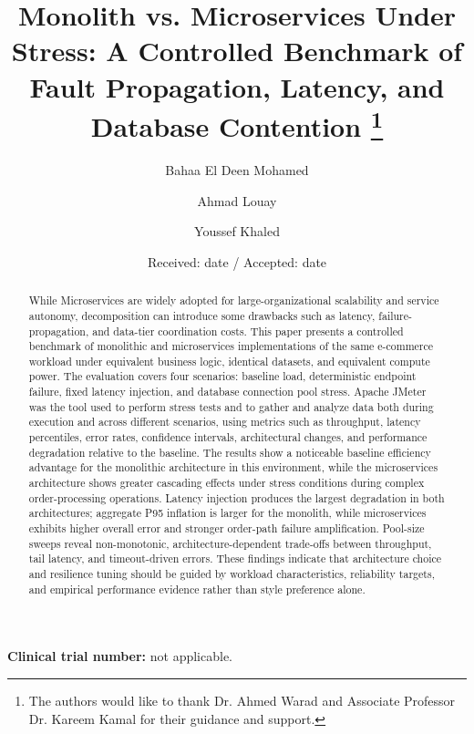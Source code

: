\documentclass[smallextended,natbib]{svjour3}
\begin{document}
\title{Monolith vs. Microservices Under Stress: A Controlled Benchmark of Fault Propagation, Latency, and Database Contention
	\thanks{The authors would like to thank Dr. Ahmed Warad and Associate Professor Dr. Kareem Kamal for their guidance and support.}
}


\author{Bahaa El Deen Mohamed \and Ahmad Louay \and Youssef Khaled}



\date{Received: date / Accepted: date}

\maketitle

\noindent\textbf{Clinical trial number:} not applicable.

\begin{abstract}
	While Microservices are widely adopted for large-organizational scalability and service autonomy, decomposition can introduce some drawbacks such as latency, failure-propagation, and data-tier coordination costs. This paper presents a controlled benchmark of monolithic and microservices implementations of the same e-commerce workload under equivalent business logic, identical datasets, and equivalent compute power. The evaluation covers four scenarios: baseline load, deterministic endpoint failure, fixed latency injection, and database connection pool stress. Apache JMeter was the tool used to perform stress tests and to gather and analyze data both during execution and across different scenarios, using metrics such as throughput, latency percentiles, error rates, confidence intervals, architectural changes, and performance degradation relative to the baseline.
	The results show a noticeable baseline efficiency advantage for the monolithic architecture in this environment, while the microservices architecture shows greater cascading effects under stress conditions during complex order-processing operations. Latency injection produces the largest degradation in both architectures; aggregate P95 inflation is larger for the monolith, while microservices exhibits higher overall error and stronger order-path failure amplification. Pool-size sweeps reveal non-monotonic, architecture-dependent trade-offs between throughput, tail latency, and timeout-driven errors. These findings indicate that architecture choice and resilience tuning should be guided by workload characteristics, reliability targets, and empirical performance evidence rather than style preference alone.
\end{abstract}
\end{document}
